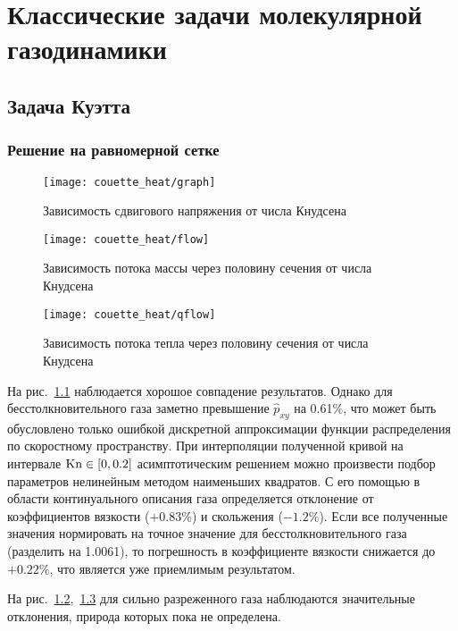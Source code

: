 \chapter{Классические задачи молекулярной газодинамики} \label{chapt:problems}

\section{Задача Куэтта} \label{sect:couette}

\subsection{Решение на равномерной сетке}

\begin{figure}
    \centering
    \texttt{[image: couette\_heat/graph]}
    \caption{Зависимость сдвигового напряжения от числа Кнудсена}\label{fig:couette:shear}
\end{figure}

\begin{figure}
    \centering
    \texttt{[image: couette\_heat/flow]}
    \caption{Зависимость потока массы через половину сечения от числа Кнудсена}\label{fig:couette:flow}
\end{figure}

\begin{figure}
    \centering
    \texttt{[image: couette\_heat/qflow]}
    \caption{Зависимость потока тепла через половину сечения от числа Кнудсена}\label{fig:couette:qflow}
\end{figure}

На рис.~\ref{fig:couette:shear} наблюдается хорошое совпадение результатов.
Однако для бесстолкновительного газа заметно превышение \(\hat{p}_{xy}\) на 0.61\%,
что может быть обусловлено только ошибкой дискретной аппроксимации функции распределения по скоростному пространству.
При интерполяции полученной кривой на интервале \(\mathrm{Kn}\in[0,0.2]\) асимптотическим решением
можно произвести подбор параметров нелинейным методом наименьших квадратов.
С его помощью в области континуального описания газа определяется отклонение
от коэффициентов вязкости (\(+0.83\%\)) и скольжения (\(-1.2\%\)).
Если все полученные значения нормировать на точное значение для бесстолкновительного газа (разделить на 1.0061),
то погрешность в коэффициенте вязкости снижается до \(+0.22\%\), что является уже приемлимым результатом.

На рис.~\ref{fig:couette:flow},~\ref{fig:couette:qflow} для сильно разреженного газа наблюдаются
значительные отклонения, природа которых пока не определена.

